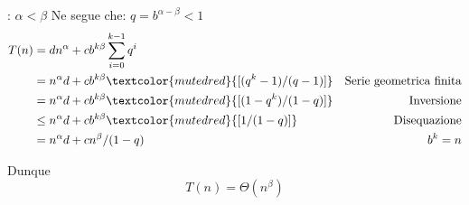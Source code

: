 \begin{tcolorbox}
	: $ \alpha < \beta $
	Ne segue che:  $q = b^{\alpha-\beta} < 1$
	\tcblower
	\begin{align*}
		T(n) & = dn^{\alpha} + cb^{k\beta} \sum_{i=0}^{k-1} q^i                                                      \\
		     & = n^{\alpha}d + cb^{k\beta}\textcolor{mutedred}{[(q^k - 1)/(q - 1)]} & \text{Serie geometrica finita} \\
		     & = n^{\alpha}d + cb^{k\beta}\textcolor{mutedred}{[(1 - q^k)/(1 - q)]} & \text{Inversione}              \\
		     & \leq n^{\alpha}d + cb^{k\beta}\textcolor{mutedred}{[1/(1 - q)]}      & \text{Disequazione}            \\
		     & = n^{\alpha}d + cn^{\beta}/(1 - q)                                   & b^k = n
	\end{align*}

	Dunque
	\[
		T(n) = \Theta (n^{\beta})
	\]
\end{tcolorbox}

